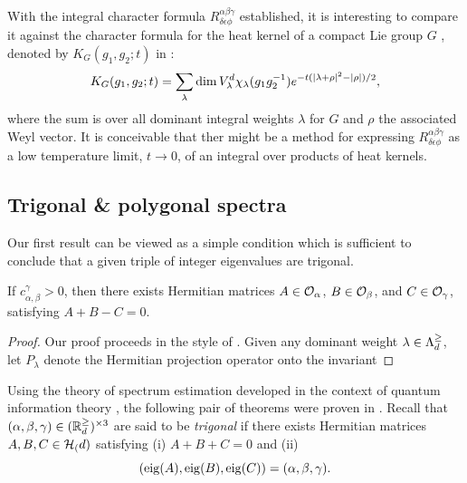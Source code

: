 \documentclass[notitlepage, 10pt]{article}
\begin{document}
{\color{blue}
\begin{rem}
    With the integral character formula $R^{\alpha\beta\gamma}_{\delta\epsilon\phi}$ established, it is interesting to compare it against the character formula for the heat kernel of a compact Lie group $G$ \cite{fegan1978heat}, denoted by $K_{G}(g_1, g_2 ; t)$ in \cite{mcswiggen2021harish}:
    \begin{equation}
        K_{G}(g_1, g_2; t) = \sum_{\lambda} \dim V_{\lambda}^{d} \chi_{\lambda}(g_1 g_2^{-1}) e^{-t(\left|\lambda+\rho\right|^{2} - \left|\rho\right|)/2},
    \end{equation}
    where the sum is over all dominant integral weights $\lambda$ for $G$ and $\rho$ the associated Weyl vector.
    It is conceivable that ther might be a method for expressing $R^{\alpha\beta\gamma}_{\delta\epsilon\phi}$ as a low temperature limit, $t \to 0$, of an integral over products of heat kernels.
\end{rem}
}

\subsection{Trigonal \& polygonal spectra}
\label{sec:trigonal_spectra}

Our first result can be viewed as a simple condition which is sufficient to conclude that a given triple of integer eigenvalues are trigonal.
\begin{lem}
    If $c_{\alpha,\beta}^{\gamma} > 0$, then there exists Hermitian matrices $A \in \mathcal O_{\alpha}$, $B \in \mathcal O_{\beta}$, and $C \in \mathcal O_{\gamma}$, satisfying $A + B - C = 0$.
\end{lem}
\begin{proof}
    Our proof proceeds in the style of \cite[Proposition 2.3]{berline2018horn}.
    Given any dominant weight $\lambda \in \Lambda^{\geq}_{d}$, let $P_{\lambda}$ denote the Hermitian projection operator onto the invariant
\end{proof}

Using the theory of spectrum estimation developed in the context of quantum information theory \cite{alicki1988symmetry,keyl2001estimating,hayashi2002quantum}, the following pair of theorems were proven in \cite{christandl2008quantum}.
Recall that $(\alpha,\beta,\gamma) \in (\mathbb R^{\geq}_{d})^{\times 3}$ are said to be \textit{trigonal} if there exists Hermitian matrices $A, B, C \in \mathcal H_{(}d)$ satisfying (i) $A+B+C=0$ and (ii)
\begin{equation}
    (\operatorname{eig}(A), \operatorname{eig}(B), \operatorname{eig}(C)) = (\alpha,\beta,\gamma).
\end{equation}
\end{document}
